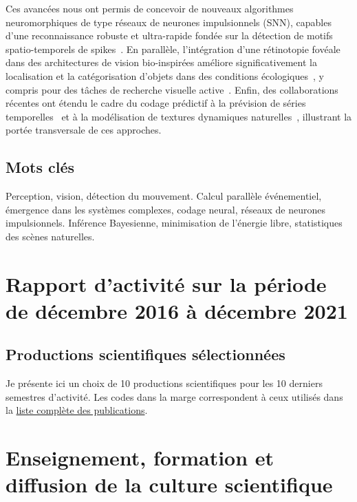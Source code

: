 \documentclass[10pt,french,a4paper,twoside]{article}%
\begin{document}
Ces avancées nous ont permis de concevoir de nouveaux algorithmes neuromorphiques de type réseaux de neurones impulsionnels (SNN), capables d'une reconnaissance robuste et ultra-rapide fondée sur la détection de motifs spatio-temporels de spikes~\citep{Grimaldi24}. En parallèle, l'intégration d'une rétinotopie fovéale dans des architectures de vision bio-inspirées améliore significativement la localisation et la catégorisation d'objets dans des conditions écologiques~\citep{Jeremie25}, y compris pour des tâches de recherche visuelle active~\citep{Jeremie25thesis}. Enfin, des collaborations récentes ont étendu le cadre du codage prédictif à la prévision de séries temporelles~\citep{Gunasekaran25} et à la modélisation de textures dynamiques naturelles~\citep{Meso25}, illustrant la portée transversale de ces approches.



\subsection*{Mots clés}
Perception, vision, détection du mouvement. Calcul parallèle événementiel, émergence dans les systèmes complexes, codage neural, réseaux de neurones impulsionnels. Inférence Bayesienne, minimisation de l'énergie libre, statistiques des scènes naturelles.

\newpage
\section{Rapport d’activité sur la période de décembre 2016 à décembre 2021} %

% 

\newpage
\subsection{Productions scientifiques sélectionnées}

Je présente ici un choix de 10 productions scientifiques pour les 10 derniers
semestres d’activité. Les codes dans la marge correspondent à ceux utilisés dans la \href{https://raw.githubusercontent.com/laurentperrinet/perrinet_curriculum-vitae.tex/master/perrinet_publications.pdf}{liste complète des publications}.


\newpage
\section{Enseignement, formation et diffusion de la culture scientifique} %
\end{document}
